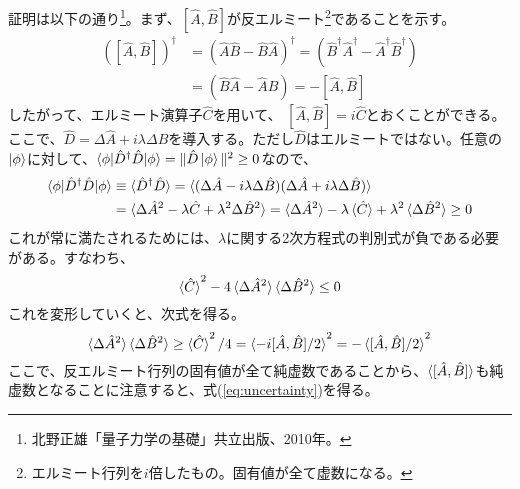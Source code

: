 証明は以下の通り\footnote{北野正雄「量子力学の基礎」共立出版、2010年。}。まず、$[\hat A, \hat B]$が反エルミート\footnote{エルミート行列を$i$倍したもの。固有値が全て虚数になる。}であることを示す。
\begin{equation}
\begin{aligned}
	\left([\hat A, \hat B]\right)^\dagger
&=\left( \hat A \hat B - \hat B \hat A\right)^\dagger = \left(\hat B^\dagger \hat A^\dagger - \hat A^\dagger \hat B^\dagger\right)\\
&=\left( \hat B\hat A - \hat A\hat B \right) = -[\hat A, \hat B]
\end{aligned}
\end{equation}
したがって、エルミート演算子$\hat C$を用いて、
$[\hat A, \hat B] = i\hat C$とおくことができる。
ここで、$\hat D = \Delta \hat A + i\lambda \Delta \hat B$を導入する。ただし$\hat D$はエルミートではない。任意の$\ket \phi$に対して、$\braket{\phi|\hat D^\dagger \hat D|\phi} = \| \hat D \ket \phi\|^2 \geq 0$なので、
\begin{equation}
\begin{aligned}
\braket{\phi|\hat D^\dagger \hat D|\phi} &\equiv  \braket {\hat D^\dagger \hat D} = \braket{(\Delta\hat A - i\lambda \Delta \hat B)(\Delta \hat A + i\lambda \Delta \hat B)} \\
&= 
  \braket{\Delta \hat A^2 - \lambda \hat C + \lambda ^2 \Delta \hat B^2} 
  = \braket{\Delta \hat A^2} - \lambda \braket{\hat C} + \lambda ^2 \braket {\Delta \hat B^2} \geq 0
\end{aligned}
\end{equation}
これが常に満たされるためには、$\lambda$に関する2次方程式の判別式が負である必要がある。すなわち、
\begin{equation}
  \braket{\hat C}^2 - 4\braket{\Delta \hat A^2}\braket{\Delta \hat B^2} \leq 0
\end{equation}
これを変形していくと、次式を得る。
\begin{equation}
    \braket{\Delta \hat A^2}\braket{\Delta \hat B^2} \geq \braket{\hat C}^2 / 4 = \braket{-i[\hat A, \hat B]/2}^2 = -\braket{[\hat A, \hat B]/2}^2
\end{equation}
ここで、反エルミート行列の固有値が全て純虚数であることから、$\braket{[\hat A, \hat B]}$も純虚数となることに注意すると、式(\ref{eq:uncertainty})を得る。



